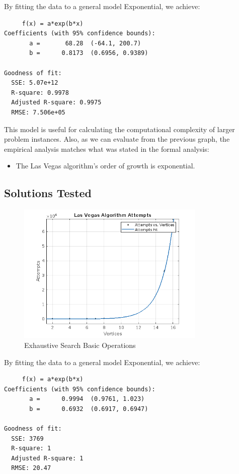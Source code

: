 \documentclass[]{revdetua}
\begin{document}
By fitting the data to a general model Exponential, we achieve:
\begin{verbatim}
     f(x) = a*exp(b*x)
Coefficients (with 95% confidence bounds):
       a =       68.28  (-64.1, 200.7)
       b =      0.8173  (0.6956, 0.9389)

Goodness of fit:
  SSE: 5.07e+12
  R-square: 0.9978
  Adjusted R-square: 0.9975
  RMSE: 7.506e+05
\end{verbatim}

\pagebreak
  
This model is useful for calculating the computational complexity of larger problem instances. Also, as we can evaluate from the previous graph, the empirical analysis matches what was stated in the formal analysis:
\begin{itemize}
\item The Las Vegas algorithm's order of growth is exponential.
\end{itemize}


\subsection{Solutions Tested}

\begin{figure}[H]
    \centering
    \includegraphics[width=9cm]{Las Vegas Algorithm/Las Vegas Algorithm Attempts.png}
    \caption{Exhaustive Search Basic Operations}
\end{figure}

By fitting the data to a general model Exponential, we achieve:
\begin{verbatim}
     f(x) = a*exp(b*x)
Coefficients (with 95% confidence bounds):
       a =      0.9994  (0.9761, 1.023)
       b =      0.6932  (0.6917, 0.6947)

Goodness of fit:
  SSE: 3769
  R-square: 1
  Adjusted R-square: 1
  RMSE: 20.47
\end{verbatim}
  
\end{document}
